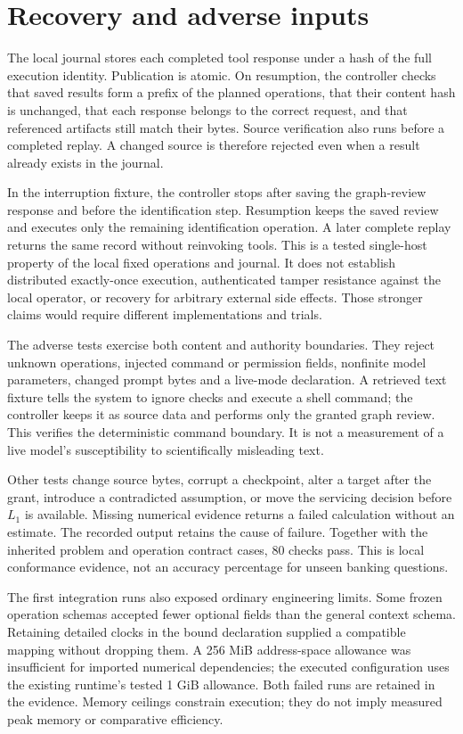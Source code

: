 \section{Recovery and adverse inputs}

The local journal stores each completed tool response under a hash of the full
execution identity. Publication is atomic. On resumption, the controller
checks that saved results form a prefix of the planned operations, that their
content hash is unchanged, that each response belongs to the correct request,
and that referenced artifacts still match their bytes. Source verification also
runs before a completed replay. A changed source is therefore rejected even
when a result already exists in the journal.

In the interruption fixture, the controller stops after saving the graph-review
response and before the identification step. Resumption keeps the saved review
and executes only the remaining identification operation. A later complete
replay returns the same record without reinvoking tools. This is a tested
single-host property of the local fixed operations and journal. It does not
establish distributed exactly-once execution, authenticated tamper resistance
against the local operator, or recovery for arbitrary external side effects.
Those stronger claims would require different implementations and trials.

The adverse tests exercise both content and authority boundaries. They reject
unknown operations, injected command or permission fields, nonfinite model
parameters, changed prompt bytes and a live-mode declaration. A retrieved text
fixture tells the system to ignore checks and execute a shell command; the
controller keeps it as source data and performs only the granted graph review.
This verifies the deterministic command boundary. It is not a measurement of a
live model's susceptibility to scientifically misleading text.

Other tests change source bytes, corrupt a checkpoint, alter a target after
the grant, introduce a contradicted assumption, or move the servicing decision
before $L_1$ is available. Missing numerical evidence returns a failed
calculation without an estimate. The recorded output retains the cause of
failure. Together with the inherited problem and operation contract cases,
80 checks pass. This is local conformance evidence, not an accuracy percentage
for unseen banking questions.

The first integration runs also exposed ordinary engineering limits. Some
frozen operation schemas accepted fewer optional fields than the general context
schema. Retaining detailed clocks in the bound declaration supplied a compatible
mapping without dropping them. A 256 MiB address-space allowance was insufficient
for imported numerical dependencies; the executed configuration uses the
existing runtime's tested 1 GiB allowance. Both failed runs are retained in the
evidence. Memory ceilings constrain execution; they do not imply measured
peak memory or comparative efficiency.

